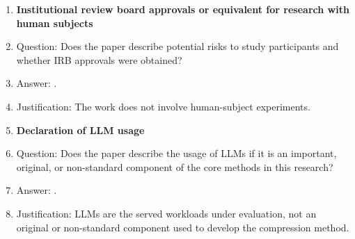 \begin{enumerate}
\item {\bf Institutional review board approvals or equivalent for research with human subjects}
    \item[] Question: Does the paper describe potential risks to study participants and whether IRB approvals were obtained?
    \item[] Answer: \answerNA{}.
    \item[] Justification: The work does not involve human-subject experiments.

\item {\bf Declaration of LLM usage}
    \item[] Question: Does the paper describe the usage of LLMs if it is an important, original, or non-standard component of the core methods in this research?
    \item[] Answer: \answerNA{}.
    \item[] Justification: LLMs are the served workloads under evaluation, not an original or non-standard component used to develop the compression method.

\end{enumerate}
